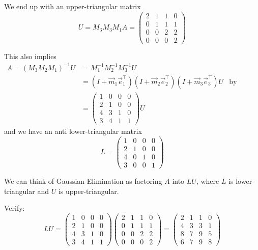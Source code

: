 \begin{example}
    We end up with an upper-triangular matrix \[
        U = M_3 M_3 M_1 A = \begin{pmatrix}
            2 & 1 & 1 & 0 \\ 0 & 1 & 1 & 1 \\ 0 & 0 & 2 & 2 \\ 0 & 0 & 0 & 2
        \end{pmatrix}
    \]

    This also implies \begin{align*}
        A = (M_3 M_2 M_1)^{-1} U
         &
        = M_1^{-1} M_2^{-1} M_3^{-1} U
        \\
         &
        = (I + \vec{m}_1 \vec{e}_1^\top) (I + \vec{m}_2 \vec{e}_2^\top) (I + \vec{m}_3 \vec{e}_3^\top) U
         & \text{by property 2}
        \\
         &
        =
        \begin{pmatrix}
            1 & 0 & 0 & 0 \\ 2 & 1 & 0 & 0 \\ 4 & 3 & 1 & 0 \\ 3 & 4 & 1 & 1
        \end{pmatrix} U
    \end{align*}
    and we have an anti lower-triangular matrix \[
        L = \begin{pmatrix}
            1 & 0 & 0 & 0 \\ 2 & 1 & 0 & 0 \\ 4 & 0 & 1 & 0 \\ 3 & 0 & 0 & 1
        \end{pmatrix}
    \]

    We can think of Gaussian Elimination as factoring \( A \) into \( LU \), where \( L \) is lower-triangular and \( U \) is upper-triangular.

    Verify: \[
        LU =
        \begin{pmatrix}
            1 & 0 & 0 & 0 \\ 2 & 1 & 0 & 0 \\ 4 & 3 & 1 & 0 \\ 3 & 4 & 1 & 1
        \end{pmatrix}
        \begin{pmatrix}
            2 & 1 & 1 & 0 \\ 0 & 1 & 1 & 1 \\ 0 & 0 & 2 & 2 \\ 0 & 0 & 0 & 2
        \end{pmatrix}
        =
        \begin{pmatrix}
            2 & 1 & 1 & 0 \\ 4 & 3 & 3 & 1 \\ 8 & 7 & 9 & 5 \\ 6 & 7 & 9 & 8
        \end{pmatrix}
    \]
\end{example}


